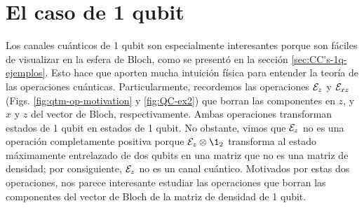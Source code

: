 \section{El caso de 1 qubit} %

% 
% 

Los canales cuánticos de 1 qubit son especialmente interesantes porque 
son fáciles de visualizar en la esfera de Bloch, como se presentó
en la sección \ref{sec:CC's-1q-ejemplos}. Esto hace que 
aporten mucha intuición física para entender la teoría de
las operaciones cuánticas. 
Particularmente, recordemos 
las operaciones $\mathcal{E}_z$ y $\mathcal{E}_{xz}$ (Figs. \ref{fig:qtm-op-motivation}
y \ref{fig:QC-ex2}) que borran las componentes en $z$, y 
$x$ y $z$ del vector de Bloch, respectivamente. Ambas operaciones
transforman estados de 1 qubit en estados de 1 qubit. No obstante, 
vimos que $\mathcal{E}_z$ no es una operación completamente positiva porque 
$\E_z\otimes\1 _2$ transforma al estado máximamente entrelazado de 
dos qubits en una matriz que no es una matriz de densidad;
por consiguiente, $\mathcal{E}_z$ no es un canal cuántico. 
Motivados por estas dos operaciones, nos parece interesante 
estudiar las operaciones que borran las componentes del 
vector de Bloch de la matriz de densidad de 1 qubit.

